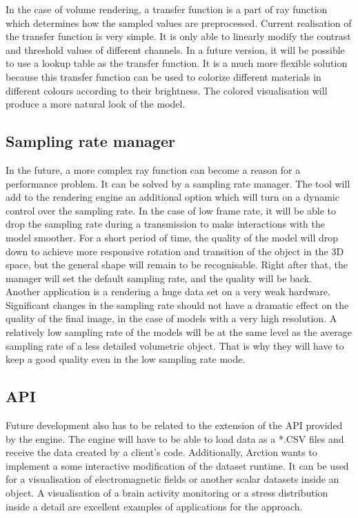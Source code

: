 \documentclass[twoside, english, 11pt]{report}
\begin{document}
In the case of volume rendering, a transfer function is a part of ray function which determines how the sampled values are preprocessed. Current realisation of the transfer function is very simple. It is only able to linearly modify the contrast and threshold values of different channels. In a future version, it will be possible to use a lookup table as the transfer function. It is a much more flexible solution because this transfer function can be used to colorize different materials in different colours according to their brightness. The colored visualisation will produce a more natural look of the model.

\subsection{Sampling rate manager}
 
In the future, a more complex ray function can become a reason for a performance problem. It can be solved by a sampling rate manager. The tool will add to the rendering engine an additional option which will turn on a dynamic control over the sampling rate. In the case of low frame rate, it will be able to drop the sampling rate during a transmission to make interactions with the model smoother. For a short period of time, the quality of the model will drop down to achieve more responsive rotation and transition of the object in the 3D space, but the general shape will remain to be recognisable. Right after that, the manager will set the default sampling rate, and the quality will be back.\\

Another application is a rendering a huge data set on a very weak hardware. Significant changes in the sampling rate should not have a dramatic effect on the quality of the final image, in the case of models with a very high resolution. A relatively low sampling rate of the models will be at the same level as the average sampling rate of a less detailed volumetric object. That is why they will have to keep a good quality even in the low sampling rate mode.


\subsection{API}

Future development also has to be related to the extension of the API provided by the engine. The engine will have to be able to load data as a *.CSV files and receive the data created by a client's code. Additionally, Arction wants to implement a some interactive modification of the dataset runtime. It can be used for a visualisation of electromagnetic fields or another scalar datasets inside an object. A visualisation of a brain activity monitoring or a stress distribution inside a detail are excellent examples of applications for the approach. \\
\end{document}
